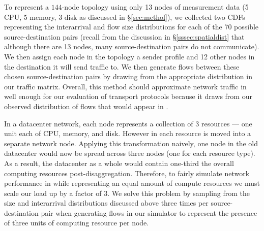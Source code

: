 
To represent a $144$-node topology using only 13 nodes of measurement data (5 CPU, 5 memory, 3 disk as discussed in \S\ref{sec:methol}), we collected two CDFs representing the interarrival and flow size distributions for each of the 70 possible source-destination pairs (recall from the discussion in \S\ref{sssec:spatialdist} that although there are 13 nodes, many source-destination pairs do not communicate).  We then assign each node in the topology a sender profile and 12 other nodes in the destination it will send traffic to. We then generate flows between these chosen source-destination pairs by drawing from the appropriate distribution in our traffic matrix. Overall, this method should approximate network traffic in \dis well enough for our evaluation of transport protocols because it draws from our observed distribution of flows that would appear in \dis.


In a \pdis datacenter network, each node represents a collection of 3 resources --- one unit each of CPU, memory, and disk. However in \dis each resource is moved into a separate network node. Applying this transformation naively, one node in the old datacenter would now be spread across three nodes (one for each resource type). As a result, the datacenter as a whole would contain one-third the overall computing resources post-disaggregation. Therefore, to fairly simulate network performance in \dis while representing an equal amount of compute resources we must scale our load up by a factor of 3. We solve this problem by sampling from the size and interarrival distributions discussed above three times per source-destination pair when generating flows in our simulator to represent the presence of three units of computing resource per node.

